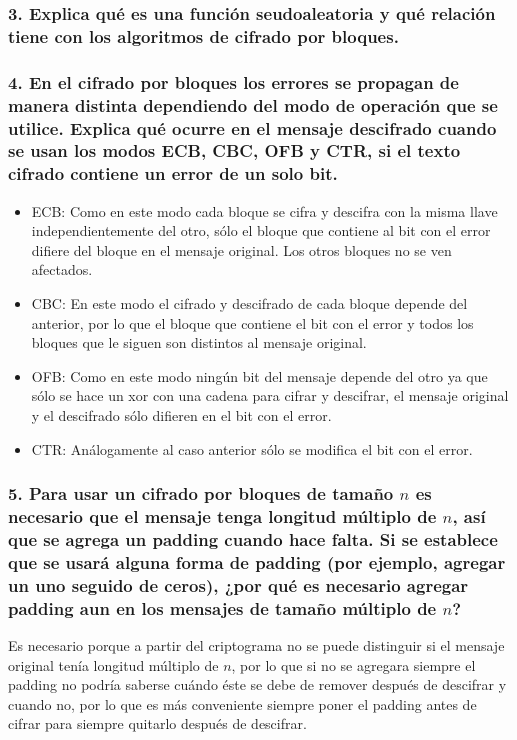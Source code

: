 \documentclass[12pt]{article}
\begin{document}
\subsubsection*{3. Explica qué es una función seudoaleatoria y qué relación tiene con los algoritmos de cifrado por bloques.}


\subsubsection*{4. En el cifrado por bloques los errores se propagan de manera distinta dependiendo del modo de operación que se utilice. Explica qué ocurre en el mensaje descifrado cuando se usan los modos ECB, CBC, OFB y CTR, si el texto cifrado contiene un error de un solo bit.}
\begin{itemize}
\item ECB: Como en este modo cada bloque se cifra y descifra con la misma llave independientemente del otro, sólo el bloque que contiene al bit con el error difiere del bloque en el mensaje original. Los otros bloques no se ven afectados.
\item CBC: En este modo el cifrado y descifrado de cada bloque depende del anterior, por lo que el bloque que contiene el bit con el error y todos los bloques que le siguen son distintos al mensaje original.
\item OFB: Como en este modo ningún bit del mensaje depende del otro ya que sólo se hace un xor con una cadena para cifrar y descifrar, el mensaje original y el descifrado sólo difieren en el bit con el error.
\item CTR: Análogamente al caso anterior sólo se modifica el bit con el error.
\end{itemize}

\subsubsection*{5. Para usar un cifrado por bloques de tamaño $n$ es necesario que el mensaje tenga longitud múltiplo de $n$, así que se agrega un padding cuando hace falta. Si se establece que se usará alguna forma de padding (por ejemplo, agregar un uno seguido de ceros), ¿por qué es necesario agregar padding aun en los mensajes de tamaño múltiplo de $n$?}
Es necesario porque a partir del criptograma no se puede distinguir si el mensaje original tenía longitud múltiplo de $n$, por lo que si no se agregara siempre el padding no podría saberse cuándo éste se debe de remover después de descifrar y cuando no, por lo que es más conveniente siempre poner el padding antes de cifrar para siempre quitarlo después de descifrar.
\end{document}
